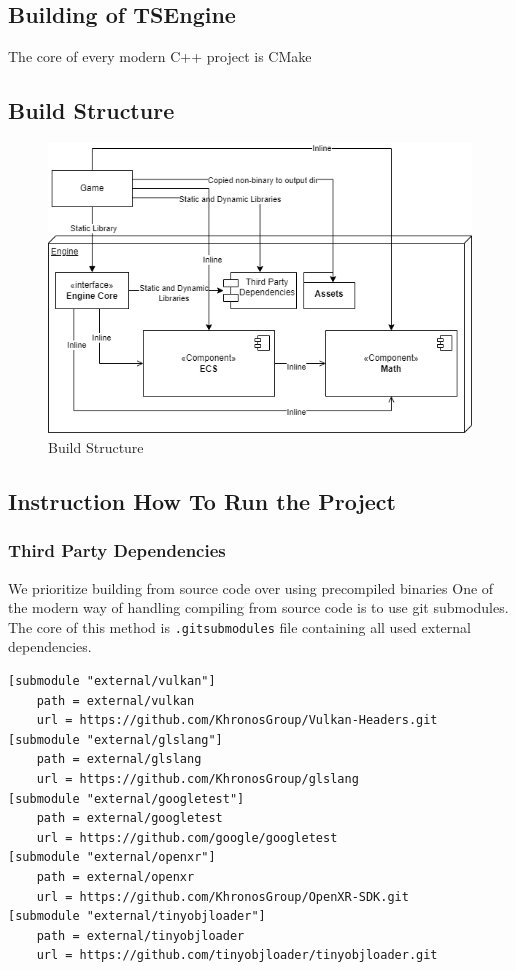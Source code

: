 \newpage

\subsection{Building of TSEngine}
\label{sec:build}
The core of every modern C++ project is CMake %

\subsection{Build Structure}
\label{sec:build_struct}
\begin{figure}
  \includegraphics[width=\linewidth]{figures/build.png}
  \caption{Build Structure}
\end{figure}

\subsection{Instruction How To Run the Project}

\newpage
\subsubsection{Third Party Dependencies}
\label{lst:3rdparty}
We prioritize building from source code over using precompiled binaries %
One of the modern way of handling compiling from source code is to use git submodules. The core of this method is \texttt{.gitsubmodules} file containing all used external dependencies.
\begin{lstlisting}[caption=.gitsubmodules]
[submodule "external/vulkan"]
	path = external/vulkan
	url = https://github.com/KhronosGroup/Vulkan-Headers.git
[submodule "external/glslang"]
	path = external/glslang
	url = https://github.com/KhronosGroup/glslang
[submodule "external/googletest"]
	path = external/googletest
	url = https://github.com/google/googletest
[submodule "external/openxr"]
	path = external/openxr
	url = https://github.com/KhronosGroup/OpenXR-SDK.git
[submodule "external/tinyobjloader"]
	path = external/tinyobjloader
	url = https://github.com/tinyobjloader/tinyobjloader.git
\end{lstlisting}

